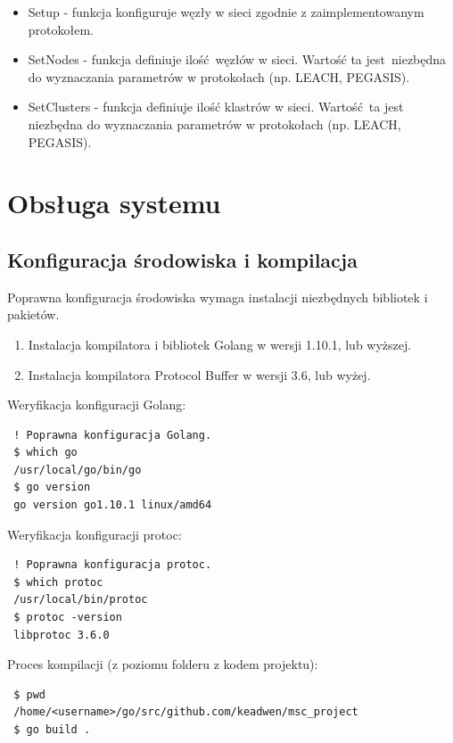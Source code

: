 \documentclass[a4paper,12pt,twoside,openany]{report}
\begin{document}
\begin{itemize}
 \item Setup - funkcja konfiguruje węzły w sieci zgodnie z zaimplementowanym protokołem.
 \item SetNodes - funkcja definiuje ilość węzłów w sieci. Wartość ta jest niezbędna do wyznaczania parametrów w protokołach (np. LEACH, PEGASIS).
 \item SetClusters - funkcja definiuje ilość klastrów w sieci. Wartość ta jest niezbędna do wyznaczania parametrów w protokołach (np. LEACH, PEGASIS).
\end{itemize}

\section{Obsługa systemu}
 
\subsection{Konfiguracja środowiska i kompilacja}

Poprawna konfiguracja środowiska wymaga instalacji niezbędnych bibliotek i pakietów.

\begin{enumerate}
 \item Instalacja kompilatora i bibliotek Golang w wersji 1.10.1, lub wyższej.
 \item Instalacja kompilatora Protocol Buffer w wersji 3.6, lub wyżej.
\end{enumerate}

Weryfikacja konfiguracji Golang:

\begin{lstlisting}
 ! Poprawna konfiguracja Golang.
 $ which go
 /usr/local/go/bin/go
 $ go version
 go version go1.10.1 linux/amd64
\end{lstlisting}

Weryfikacja konfiguracji protoc:

\begin{lstlisting}
 ! Poprawna konfiguracja protoc.
 $ which protoc
 /usr/local/bin/protoc
 $ protoc -version
 libprotoc 3.6.0
\end{lstlisting}

Proces kompilacji (z poziomu folderu z kodem projektu):

\begin{lstlisting}
 $ pwd
 /home/<username>/go/src/github.com/keadwen/msc_project
 $ go build .
\end{lstlisting}
\end{document}
